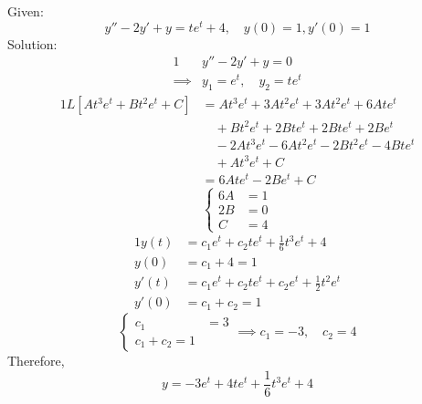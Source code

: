 \documentclass[diffeq.tex]{subfiles}
\begin{document}
\begin{homework*}[141.13]
    Given:
    \begin{equation}
        y'' - 2y' + y = te^{t} + 4,\quad y(0) = 1, y'(0) = 1
    \end{equation}
    Solution:
    \begin{alignat}{1}
        &y'' - 2y' + y = 0\\
        \implies&y_{1} = e^{t},\quad y_{2} = te^{t}
    \end{alignat}
    \begin{alignat}{1}
        L[At^{3}e^{t} + Bt^{2}e^{t} + C] &= At^{3}e^{t} + 3At^{2}e^{t} + 3At^{2}e^{t} + 6Ate^{t}\\
        &\quad + Bt^{2}e^{t} + 2Bte^{t} + 2Bte^{t} + 2Be^{t}\\
        &\quad -2At^{3}e^{t} - 6At^{2}e^{t} - 2Bt^{2}e^{t} - 4Bte^{t}\\
        &\quad +At^{3}e^{t} + C\\
        &= 6Ate^{t} - 2Be^{t} + C
    \end{alignat}
    \begin{equation}
        \begin{cases}
            6A &= 1\\
            2B &= 0\\
            C &= 4
        \end{cases}
    \end{equation}
    \begin{alignat}{1}
        y(t) &= c_{1}e^{t} + c_{2}te^{t} + \frac{1}{6}t^{3}e^{t} + 4\\
        y(0) &= c_{1} + 4 = 1\\
        y'(t) &= c_{1}e^{t} + c_{2}te^{t} + c_{2}e^{t} + \frac{1}{2}t^{2}e^{t}\\
        y'(0) &= c_{1} + c_{2} = 1
    \end{alignat}
    \begin{equation}
        \begin{cases}
            c_{1} &= 3\\
            c_{1} + c_{2} = 1
        \end{cases}
        \implies c_{1} = -3,\quad c_{2} = 4
    \end{equation}
    Therefore,
    \begin{equation}
        y = -3e^{t} + 4te^{t} + \frac{1}{6}t^{3}e^{t} + 4
    \end{equation}
\end{homework*}
\np
\end{document}
